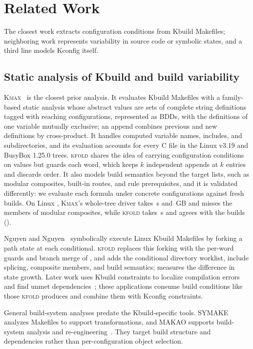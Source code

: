 \documentclass[acmsmall,screen,review]{acmart}
\newcommand{\tool}{\textsc{kfold}\xspace}
\newcommand{\kmax}{\textsc{Kmax}\xspace}
\begin{document}
\section{Related Work}
\label{sec:related}

The closest work extracts configuration conditions from Kbuild Makefiles; neighboring work represents variability in source code or symbolic states, and a third line models Kconfig itself.

\subsection{Static analysis of Kbuild and build variability}
\kmax~\cite{gazzillo2017kmax} is the closest prior analysis. It evaluates Kbuild Makefiles with a family-based static analysis whose abstract values are sets of complete string definitions tagged with reaching configurations, represented as BDDs, with the definitions of one variable mutually exclusive; an append combines previous and new definitions by cross-product. It handles computed variable names, includes, and subdirectories, and its evaluation accounts for every C file in the Linux v3.19 and BusyBox 1.25.0 trees. \tool shares the idea of carrying configuration conditions on values but guards each word, which keeps $k$ independent appends at $k$ entries and discards order. It also models build semantics beyond the target lists, such as modular composites, built-in routes, and rule prerequisites, and it is validated differently: we evaluate each formula under concrete configurations against fresh builds. On Linux \NLinuxVersion, \kmax's whole-tree driver takes \NLinuxKmaxSeconds\,s and \NLinuxKmaxRssGb\,GB and misses the members of modular composites, while \tool takes \NLinuxSeconds\,s and agrees with the builds ().

Nguyen and Nguyen~\cite{nguyen2020using} symbolically execute Linux Kbuild Makefiles by forking a path state at each conditional. \tool replaces this forking with the per-word guards and branch merge of , and adds the conditional directory worklist, include splicing, composite members, and build semantics;  measures the difference in state growth. Later work uses Kbuild constraints to localize compilation errors and find unmet dependencies~\cite{gazzillo2018localizing,oh2021kclause}; these applications consume build conditions like those \tool produces and combine them with Kconfig constraints.

General build-system analyses predate the Kbuild-specific tools. \textsc{SYMAKE} analyzes Makefiles to support transformations, and \textsc{MAKAO} supports build-system analysis and re-engineering~\cite{tamrawi2012symake,adams2007makao}. They target build structure and dependencies rather than per-configuration object selection.
\end{document}
